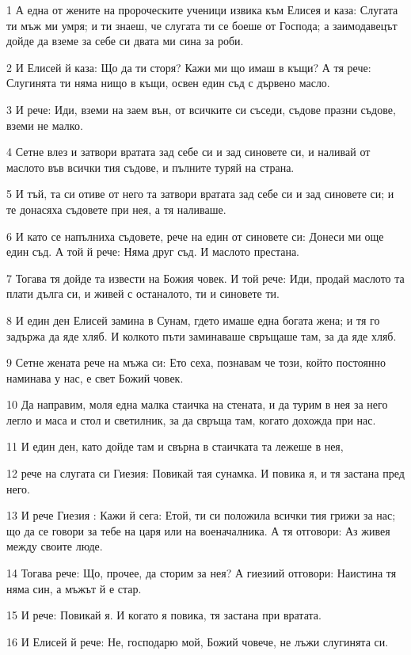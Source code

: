 \par 1 А една от жените на пророческите ученици извика към Елисея и каза: Слугата ти мъж ми умря; и ти знаеш, че слугата ти се боеше от Господа; а заимодавецът дойде да вземе за себе си двата ми сина за роби.
\par 2 И Елисей й каза: Що да ти сторя? Кажи ми що имаш в къщи? А тя рече: Слугинята ти няма нищо в къщи, освен един съд с дървено масло.
\par 3 И рече: Иди, вземи на заем вън, от всичките си съседи, съдове празни съдове, вземи не малко.
\par 4 Сетне влез и затвори вратата зад себе си и зад синовете си, и наливай от маслото във всички тия съдове, и пълните туряй на страна.
\par 5 И тъй, та си отиве от него та затвори вратата зад себе си и зад синовете си; и те донасяха съдовете при нея, а тя наливаше.
\par 6 И като се напълниха съдовете, рече на един от синовете си: Донеси ми още един съд. А той й рече: Няма друг съд. И маслото престана.
\par 7 Тогава тя дойде та извести на Божия човек. И той рече: Иди, продай маслото та плати дълга си, и живей с останалото, ти и синовете ти.
\par 8 И един ден Елисей замина в Сунам, гдето имаше една богата жена; и тя го задържа да яде хляб. И колкото пъти заминаваше свръщаше там, за да яде хляб.
\par 9 Сетне жената рече на мъжа си: Ето сеха, познавам че този, който постоянно наминава у нас, е свет Божий човек.
\par 10 Да направим, моля една малка стаичка на стената, и да турим в нея за него легло и маса и стол и светилник, за да свръща там, когато дохожда при нас.
\par 11 И един ден, като дойде там и свърна в стаичката та лежеше в нея,
\par 12 рече на слугата си Гиезия: Повикай тая сунамка. И повика я, и тя застана пред него.
\par 13 И рече Гиезия : Кажи й сега: Етой, ти си положила всички тия грижи за нас; що да се говори за тебе на царя или на военачалника. А тя отговори: Аз живея между своите люде.
\par 14 Тогава рече: Що, прочее, да сторим за нея? А гиезиий отговори: Наистина тя няма син, а мъжът й е стар.
\par 15 И рече: Повикай я. И когато я повика, тя застана при вратата.
\par 16 И Елисей й рече: Не, господарю мой, Божий човече, не лъжи слугинята си.
